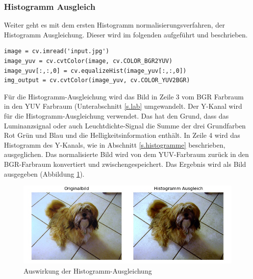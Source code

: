 \subsubsection{Histogramm Ausgleich}
Weiter geht es mit dem ersten Histogramm normalisierungsverfahren, der Histogramm Ausgleichung. Dieser wird im folgenden aufgeführt und beschrieben.\\
\begin{lstlisting}
image = cv.imread('input.jpg')
image_yuv = cv.cvtColor(image, cv.COLOR_BGR2YUV)
image_yuv[:,:,0] = cv.equalizeHist(image_yuv[:,:,0])
img_output = cv.cvtColor(image_yuv, cv.COLOR_YUV2BGR)
\end{lstlisting}
Für die Histogramm-Ausgleichung \cite{histogram2012equalisation} wird das Bild in Zeile 3 vom BGR Farbraum in den YUV Farbraum (Unterabschnitt \ref{s.lab} umgewandelt. Der Y-Kanal wird für die Histogramm-Ausgleichung verwendet. Das hat den Grund, dass das Luminanzsignal oder auch Leuchtdichte-Signal die Summe der drei Grundfarben Rot Grün und Blau und die Helligkeitsinformation enthält. In Zeile 4 wird das Histogramm des Y-Kanals, wie in Abschnitt \ref{s.histogramme} beschrieben, ausgeglichen. Das normalisierte Bild wird von dem YUV-Farbraum zurück in den BGR-Farbraum konvertiert und zwischengespeichert. Das Ergebnis wird als Bild ausgegeben (Abbildung \ref{img:histogrameq}).
\begin{figure}
	[h]
	\centering
	\includegraphics[scale=0.7]{Sources/histeq.jpg}
	\caption{Auswirkung der Histogramm-Ausgleichung}
	\label{img:histogrameq}
\end{figure}	
\newpage
